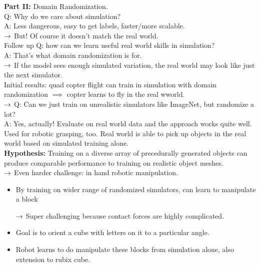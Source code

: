{\bf Part II:} Domain Randomization. \\

Q: Why do we care about simulation? \\

A: Less dangerous, easy to get labels, faster/more scalable. \\

$\rightarrow$ But! Of course it doesn't match the real world. \\

Follow up Q: how can we learn useful real world skills in simulation? \\

A: That's what domain randomization is for. \\

$\rightarrow$ If the model sees enough simulated variation, the real world may look like just the next simulator. \\

Initial results: quad copter flight can train in simulation with domain randomization $\implies$ copter learns to fly in the real wworld. \\

$\rightarrow$ Q: Can we just train on unrealistic simulators like ImageNet, but randomize a lot? \\

A: Yes, actually! Evaluate on real world data and the approach works quite well. Used for robotic grasping, too. Real world is able to pick up objects in the real world based on simulated training alone. \\

{\bf Hypothesis:} Training on a diverse array of precedurally generated objects can produce comparable performance to training on realistic object meshes. \\

$\rightarrow$ Even harder challenge: in hand robotic manipulation.
\begin{itemize}
    \item By training on wider range of randomized simulators, can learn to manipulate a block
    
    $\rightarrow$ Super challenging because contact forces are highly complicated.
    
    \item Goal is to orient a cube with letters on it to a particular angle.
    
    \item Robot learns to do manipulate these blocks from simulation alone, also extension to rubix cube.
\end{itemize}

